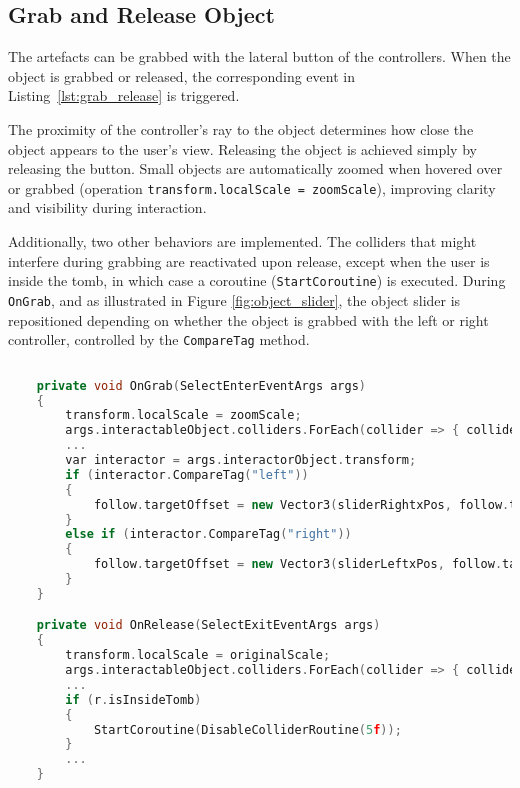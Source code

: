 \subsection*{Grab and Release Object}

The artefacts can be grabbed with the lateral button of the controllers.
When the object is grabbed or released, the corresponding event in Listing~\ref{lst:grab_release} is triggered.  

The proximity of the controller's ray to the object determines how close the object appears to the user's view. 
Releasing the object is achieved simply by releasing the button.  
Small objects are automatically zoomed when hovered over or grabbed (operation \texttt{transform.localScale = zoomScale}), improving clarity and visibility during interaction.

Additionally, two other behaviors are implemented. 
The colliders that might interfere during grabbing are reactivated upon release, except when the user is inside the tomb, in which case a coroutine (\texttt{StartCoroutine}) is executed.
During \texttt{OnGrab}, and as illustrated in Figure \ref{fig:object_slider}, the object slider is repositioned depending on whether the object is grabbed with the left or right controller, controlled by the \texttt{CompareTag} method.

\begin{lstlisting}[language=C++, caption={Partial Fragment of objects onGrab and onRelease events.}, label={lst:grab_release}]
     
    private void OnGrab(SelectEnterEventArgs args)
    {
        transform.localScale = zoomScale;
        args.interactableObject.colliders.ForEach(collider => { collider.enabled = false; });
        ...
        var interactor = args.interactorObject.transform;
        if (interactor.CompareTag("left")) 
        {
            follow.targetOffset = new Vector3(sliderRightxPos, follow.targetOffset.y, follow.targetOffset.z);
        }
        else if (interactor.CompareTag("right")) 
        {
            follow.targetOffset = new Vector3(sliderLeftxPos, follow.targetOffset.y, follow.targetOffset.z);
        }
    }

    private void OnRelease(SelectExitEventArgs args)
    {
        transform.localScale = originalScale;
        args.interactableObject.colliders.ForEach(collider => { collider.enabled = true; });
        ...
        if (r.isInsideTomb)
        {
            StartCoroutine(DisableColliderRoutine(5f));
        }
        ...
    }
\end{lstlisting}



